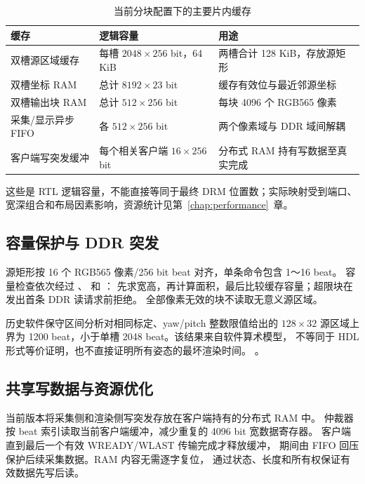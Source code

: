 \begin{table}[htbp]\centering\small
\caption{当前分块配置下的主要片内缓存}
\begin{tabularx}{\textwidth}{p{4.2cm}YY}
\toprule
缓存 & 逻辑容量 & 用途 \\
\midrule
双槽源区域缓存 & 每槽 $2048\times256$ bit，64 KiB & 两槽合计 128 KiB，存放源矩形 \\
双槽坐标 RAM & 总计 $8192\times23$ bit & 缓存有效位与最近邻源坐标 \\
双槽输出块 RAM & 总计 $512\times256$ bit & 每块 4096 个 RGB565 像素 \\
采集/显示异步 FIFO & 各 $512\times256$ bit & 两个像素域与 DDR 域间解耦 \\
客户端写突发缓冲 & 每个相关客户端 $16\times256$ bit & 分布式 RAM 持有写数据至真实完成 \\
\bottomrule
\end{tabularx}
\end{table}
这些是 RTL 逻辑容量，不能直接等同于最终 DRM 位置数；实际映射受到端口、
宽深组合和布局因素影响，资源统计见第~\ref{chap:performance}~章。

\subsection{容量保护与 DDR 突发}
源矩形按 16 个 RGB565 像素/256 bit beat 对齐，单条命令包含 1～16 beat。
容量检查依次经过 、 和 ：
先求宽高，再计算面积，最后比较缓存容量；超限块在发出首条 DDR 读请求前拒绝。
全部像素无效的块不读取无意义源区域。

历史软件保守区间分析对相同标定、yaw/pitch 整数限值给出的 $128\times32$
源区域上界为 1200 beat，小于单槽 2048 beat。该结果来自软件算术模型，
不等同于 HDL 形式等价证明，也不直接证明所有姿态的最坏渲染时间。
。

\subsection{共享写数据与资源优化}
当前版本将采集侧和渲染侧写突发存放在客户端持有的分布式 RAM 中。
仲裁器按 beat 索引读取当前客户端缓冲，减少重复的 4096 bit 宽数据寄存器。
客户端直到最后一个有效 WREADY/WLAST 传输完成才释放缓冲，
期间由 FIFO 回压保护后续采集数据。RAM 内容无需逐字复位，
通过状态、长度和所有权保证有效数据先写后读。

